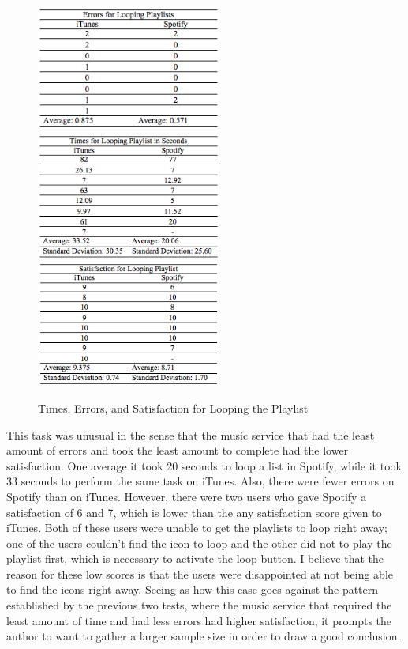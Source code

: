 \documentclass[11pt]{article}
\begin{document}
\begin{figure}[H] %
   \centering
   \includegraphics[width=2.4in]{errors_loop.png}       
   \includegraphics[width=2.4in]{times_loop.png}
   \includegraphics[width=2.4in]{satisfaction_looping.png}        
   \caption{Times, Errors, and Satisfaction for Looping the Playlist}
   \label{fig:loop}
\end{figure}

This task was unusual in the sense that the music service that had the least amount of errors and took the least amount to complete had the lower satisfaction. One average it took 20 seconds to loop a list in Spotify, while it took 33 seconds to perform the same task on iTunes. Also, there were fewer errors on Spotify than on iTunes. However, there were two users who gave Spotify a satisfaction of 6 and 7, which is lower than the any satisfaction score given to iTunes. Both of these users were unable to get the playlists to loop right away; one of the users couldn't find the icon to loop and the other did not to play the playlist first, which is necessary to activate the loop button. I believe that the reason for these low scores is that the users were disappointed at not being able to find the icons right away. Seeing as how this case goes against the pattern established by the previous two tests, where the music service that required the least amount of time and had less errors had higher satisfaction, it prompts the author to want to gather a larger sample size in order to draw a good conclusion. %
\end{document}
